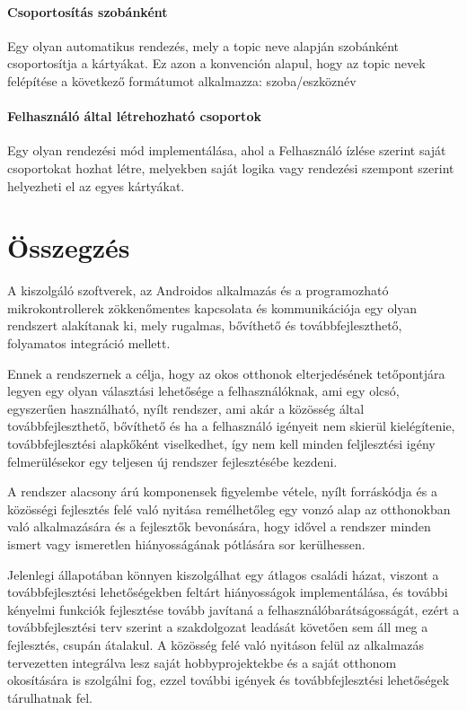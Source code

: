 \documentclass[
]{thesis-ekf}
\theoremstyle{definition}
\theoremstyle{remark}
\begin{document}
\subsubsection{Csoportosítás szobánként}
Egy olyan automatikus rendezés, mely a topic neve alapján szobánként csoportosítja a kártyákat.
Ez azon a konvención alapul, hogy az topic nevek felépítése a következő formátumot alkalmazza: szoba/eszköznév

\subsubsection{Felhasználó által létrehozható csoportok}
Egy olyan rendezési mód implementálása, ahol a Felhasználó ízlése szerint saját csoportokat hozhat létre, 
melyekben saját logika vagy rendezési szempont szerint helyezheti el az egyes kártyákat.

\chapter*{Összegzés}
A kiszolgáló szoftverek, az Androidos alkalmazás és a programozható mikrokontrollerek zökkenőmentes kapcsolata
és kommunikációja egy olyan rendszert alakítanak ki, mely rugalmas, bővíthető és továbbfejleszthető, folyamatos
integráció mellett.

Ennek a rendszernek a célja, hogy az okos otthonok elterjedésének tetőpontjára legyen egy olyan választási lehetősége a
felhasználóknak, ami egy olcsó, egyszerűen használható, nyílt rendszer, ami akár a közösség
által továbbfejleszthető, bővíthető és ha a felhasználó igényeit nem skierül kielégítenie, továbbfejlesztési
alapkőként viselkedhet, így nem kell minden feljlesztési igény felmerülésekor egy teljesen új rendszer fejlesztésébe
kezdeni.

A rendszer alacsony árú komponensek figyelembe vétele, nyílt forráskódja és a közösségi fejlesztés felé való nyitása
remélhetőleg egy vonzó alap az otthonokban való alkalmazására és a fejlesztők bevonására, hogy idővel a rendszer minden
ismert vagy ismeretlen hiányosságának pótlására sor kerülhessen.

Jelenlegi állapotában könnyen kiszolgálhat egy átlagos családi házat, viszont a továbbfejlesztési lehetőségekben
feltárt hiányosságok implementálása, és további kényelmi funkciók fejlesztése tovább javítaná a felhasználóbarátságosságát, ezért a továbbfejlesztési terv szerint a szakdolgozat leadását követően sem áll meg a
fejlesztés, csupán átalakul. A közösség felé való nyitáson felül az alkalmazás tervezetten integrálva lesz
saját hobbyprojektekbe és a saját otthonom okosítására is szolgálni fog, ezzel további igények és továbbfejlesztési
lehetőségek tárulhatnak fel.
\end{document}
